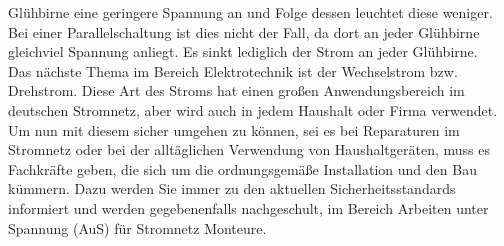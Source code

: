 Glühbirne eine geringere Spannung an und Folge dessen leuchtet diese weniger. Bei einer Parallelschaltung ist dies nicht der Fall, da dort an jeder 
Glühbirne gleichviel Spannung anliegt. Es sinkt lediglich der Strom an jeder Glühbirne. %
\\
Das nächste Thema im Bereich Elektrotechnik ist der Wechselstrom bzw. Drehstrom. Diese Art des Stroms hat einen großen Anwendungsbereich im deutschen 
Stromnetz, aber wird auch in jedem Haushalt oder Firma verwendet. Um nun mit diesem sicher umgehen zu können, sei es bei Reparaturen im Stromnetz oder 
bei der alltäglichen Verwendung von Haushaltgeräten, muss es Fachkräfte geben, die sich um die ordnungsgemäße Installation und den Bau kümmern. Dazu werden 
Sie immer zu den aktuellen Sicherheitsstandards informiert und werden gegebenenfalls nachgeschult, \zB im Bereich Arbeiten unter Spannung (AuS) für 
Stromnetz Monteure.

